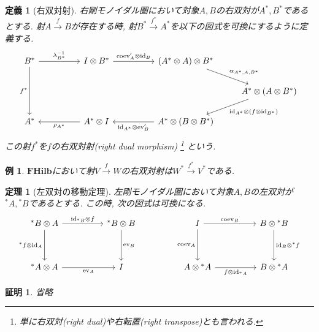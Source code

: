 \documentclass[a4paper,12pt]{ltjsarticle}
\theoremstyle{break}
\newtheorem{defn}[thm]{定義}
\newtheorem{thrm}[thm]{定理}
\newtheorem{eg}[thm]{例}
\newtheorem*{prf}{証明}
\newcommand{\fhilb}{\mathbf{FHilb}}
\newcommand{\xr}[1]{\xrightarrow{#1}}
\newcommand{\id}{\mathrm{id}}
\newcommand{\eva}{\mathrm{ev}}
\newcommand{\coev}{\mathrm{coev}}
\newcommand{\al}{\alpha}
\newcommand{\la}{\lambda}
\newcommand{\ot}{\otimes}
\numberwithin{equation}{section}
\begin{document}
\begin{defn}[右双対射]
  右剛モノイダル圏において対象$A,B$の右双対が$A^*,B^*$であるとする. 
  射$A \xr{f} B$が存在する時, 射$B^* \xr{f^*} A^*$を以下の図式を可換にするように定義する. 
  \[\begin{tikzcd}
    {B^*} && {I \ot B^*} && {(A^* \ot A) \ot B^*} \\
    &&&&& {A^* \ot (A \ot B^*)} \\
    {A^*} && {A^* \ot I} && {A^* \ot (B \ot B^*)}
    \arrow["{\coev'_A \ot \id_B}", from=1-3, to=1-5]
    \arrow["{\al_{A^*,A,B^*}}", from=1-5, to=2-6]
    \arrow["{\id_{A^*} \ot (f \ot \id_{B^*})}", from=2-6, to=3-5]
    \arrow["{\id_{A^*} \ot \eva'_B}", from=3-5, to=3-3]
    \arrow["{\la_{B^*}^{-1}}", from=1-1, to=1-3]
    \arrow["{f^*}"', from=1-1, to=3-1]
    \arrow["{\rho_{A^*}}", from=3-3, to=3-1]
  \end{tikzcd}\]
  この射$f^*$を$f$の右双対射(right dual morphism)
  \footnote{
    単に右双対(right dual)や右転置(right transpose)とも言われる. 
  }
  という. 
\end{defn}

\begin{eg}
  $\fhilb$において射$V \xr{f} W$の右双対射は$W^* \xr{f^*} V^*$である. 
\end{eg}

\begin{thrm}[左双対の移動定理]
  左剛モノイダル圏において対象$A,B$の左双対が${}^*A,{}^*B$であるとする. 
  この時, 次の図式は可換になる. 
  \[\begin{tikzcd}
    {{}^*B \ot A} && {{}^*B \ot B} && I && {B \ot {}^*B} \\
    \\
    {{}^*A \ot A} && I && {A \ot {}^*A} && {B \ot {}^*A}
    \arrow["{\id_{{}^*B} \ot f}", from=1-1, to=1-3]
    \arrow["{{}^*f \ot \id_A}"', from=1-1, to=3-1]
    \arrow["{\eva_A}"', from=3-1, to=3-3]
    \arrow["{\eva_B}", from=1-3, to=3-3]
    \arrow["{\coev_B}", from=1-5, to=1-7]
    \arrow["{\coev_A}"', from=1-5, to=3-5]
    \arrow["{f \ot \id_{{}^*A}}"', from=3-5, to=3-7]
    \arrow["{\id_B \ot {}^*f}", from=1-7, to=3-7]
  \end{tikzcd}\]
\end{thrm}

\begin{prf}
  省略
\end{prf}
\end{document}
